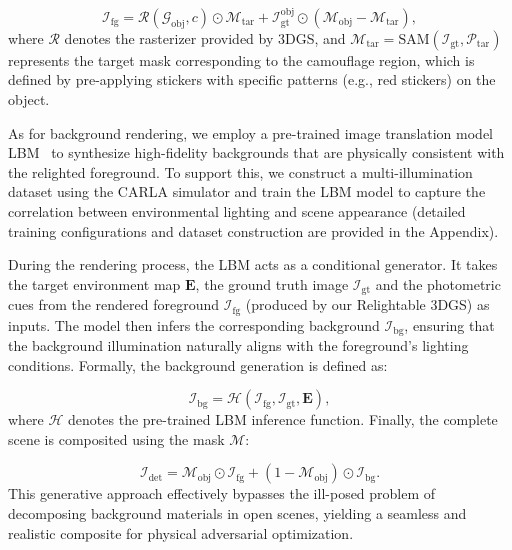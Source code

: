 \documentclass[10pt,journal,compsoc]{IEEEtran}
\begin{document}
\begin{equation}
\mathcal{I}_{\text{fg}} = \mathcal{R}(\mathcal{G}_{\text{obj}}, c) \odot \mathcal{M}_{\text{tar}} + \mathcal{I}_{\text{gt}}^{\text{obj}} \odot (\mathcal{M}_{\text{obj}}-\mathcal{M}_{\text{tar}}),
\label{eq:}
\end{equation}
where $\mathcal{R}$ denotes the rasterizer provided by 3DGS, and $\mathcal{M}_{\text{tar}}=\text{SAM}(\mathcal{I}_{\text{gt}}, \mathcal{P}_{\text{tar}})$ represents the target mask corresponding to the camouflage region, which is defined by pre-applying stickers with specific patterns (e.g., red stickers) on the object.

As for background rendering, we employ a pre-trained image translation model LBM~\cite{chadebec2025lbm} to synthesize high-fidelity backgrounds that are physically consistent with the relighted foreground.
To support this, we construct a multi-illumination dataset using the CARLA simulator and train the LBM model to capture the correlation between environmental lighting and scene appearance (detailed training configurations and dataset construction are provided in the Appendix).

During the rendering process, the LBM acts as a conditional generator.
It takes the target environment map $\bm{E}$, the ground truth image $\mathcal{I}_{\text{gt}}$ and the photometric cues from the rendered foreground $\mathcal{I}_{\text{fg}}$ (produced by our Relightable 3DGS) as inputs. The model then infers the corresponding background $\mathcal{I}_{\text{bg}}$, ensuring that the background illumination naturally aligns with the foreground's lighting conditions. Formally, the background generation is defined as:

\begin{equation}
\mathcal{I}_{\text{bg}} = \mathcal{H}(\mathcal{I}_{\text{fg}}, \mathcal{I}_{\text{gt}}, \bm{E}),
\label{eq:}
\end{equation}
where $\mathcal{H}$ denotes the pre-trained LBM inference function. Finally, the complete scene is composited using the mask $\mathcal{M}$:

\begin{equation}
\mathcal{I}_{\text{det}} = \mathcal{M}_{\text{obj}} \odot \mathcal{I}_{\text{fg}} + (1 - \mathcal{M}_{\text{obj}}) \odot \mathcal{I}_{\text{bg}}.
\label{eq:}
\end{equation}
This generative approach effectively bypasses the ill-posed problem of decomposing background materials in open scenes, yielding a seamless and realistic composite for physical adversarial optimization.
\end{document}

